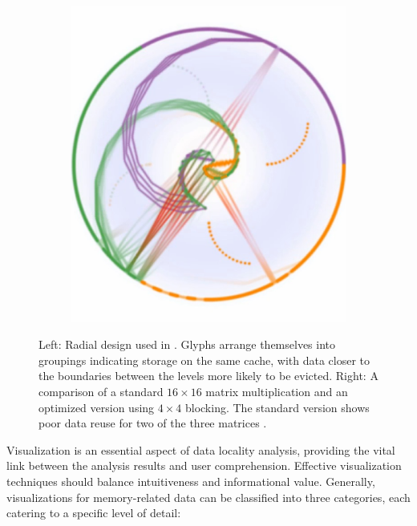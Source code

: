 \begin{figure}
\begin{subfigure}[c]{.24\linewidth}
		\includegraphics[width=\linewidth]{pictures/abstract_optimized.png}
	\end{subfigure}
	\caption{Left: Radial design used in \cite{choudhury2011abstract}. Glyphs arrange themselves into groupings indicating storage on the same cache, with data closer to the boundaries between the levels more likely to be evicted. Right: A comparison of a standard $16 \times 16$ matrix multiplication and an optimized version using $4 \times 4$ blocking. The standard version shows poor data reuse for two of the three matrices \cite{choudhury2011abstract}.}
	\label{fig:abstract_cache}
\end{figure}

Visualization is an essential aspect of data locality analysis, providing the vital link between the analysis results and user comprehension. Effective visualization techniques should balance intuitiveness and informational value. Generally, visualizations for memory-related data can be classified into three categories, each catering to a specific level of detail:

